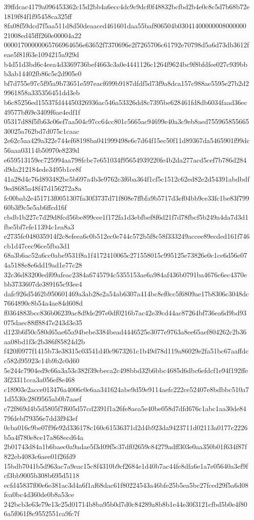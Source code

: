 {39ffdcac4179a096453362c15d2bb4a6ecc4dc9c9dcf0f48832bcfbd2b4e0c8c5d7b68b72e1819f84f1f95458ca325ff
8fa08f59dcd7f5aa511d8d50deaaced461601daa55baf806504b0304140000000800000021008ed45fff260e00004a22
00001700000065766964656e63652f7370696e2f7265706c61792e70798d5a6d73db3612feae5f81f63e1094215a929d
b4d51d3bd6c4eea4d3369736bef4663c3a0e4441126c1264f9624bc9f8bfdfee027c939bbb3ab14402fb86c5e2d905e0
bf7d755e97c5f95a9b73651e597eacf699b9187dfdf5d73f9a8dca157c988ae5595e27b2d29961858a335356451dd3eb
b6c85256ed15537fd44450326936ac546a53326dd8c7395be628461fd8db6034faad36ec49577bf69e3409f6ae4edf1f
05317d88f5fb63c06ef7aa504c97cc64cc801c5665ac94699e40a3c9eb8aed75596585566530025a762bd7d075c1caac
2e62c5aa429a322e744ef68198ba041999498e6c7d64f15ec50f11d89367da5465901f99dc56aaa03114b50970e8239d
e659513159ec725994aa798fcbc7e651034f95654939220fe4b2da277acd5cef7b786d284d9da212184ede3495b1ce8f
41a28d4c76d893482bc5b697a4b3e9762c3f6ba364f1cf5c1512c62ed82e2d54391abdbdf9ed8685a48f47d156272a8a
fc00bab2e451713f0051307fa30f3737d71f808e7ffbfa9b5717d3ef04bb9ce33fc1be83f79960b3f9c5e5ab6ffcd16f
cbdb1b227c7d29d8fcd56be899cee1f172fa1d3ebfbef8f6d21f7d78fbcf5b249a4da7d3d1fbe5bf7efe11394c1ea8a3
e2735fc048035914f2c8efeea6c0b512ec0e744c572b5f8c58f333249accee89ecded161f746cb1d47cec96ce5fba3d1
68a3b6ac52a6cc0abe9531f8a1f4172410065c271558015c995125e73826e0c1ce6d56e074a5188e8e6dd19ad1e77c28
32c36d83200edf09afeac2384a6745794c5355153ae6a984af436b0791ba4676c6ec4370ebb3733607de389165c93ee4
dafc926d5462b950601469a3ab28e2a54ab6307a414bc8ef0cc5f6809ae17b8306c3048dc7664890c8b54a4ae84d608d
f0364883bcc836b06239ac8d9de297e0df0216b7ac42e39cd44ac87264bf736ea6d9bd93075daec88ff8847e243d3e35
d123b6f50c580d65ae65a94bebe3384bead4446525e3077e9763a8ee65aef804262c2b36aa08bd1f3c2b386f85824d2b
f420f0977f1415b73e38315c03541d40c9673261c1b49d78d119a86029e2fa51bc67aaffdcc582d95923c14b9b2c0d60
5e244c7904ed9c66a3a53c382f39ebeca2c498bbd32b6bbc4685d6dbc6efdcf1e94f192ffe3f23311cca3a056ef8e468
c18903e2acce013476a4006c0e6aa341624abe9d59e9114aefc222ce52407e8bdbbc510a71d5530c2809565ab0b7aaef
c72f869d4b5d5805f7f605d57cd2391f1a26fe8aea5e40be058d7dfd676c1abc1aa30de8479fdebf79356e7dd3f943ef
0cba016c9be07f9fe92d336178c160c61536371d2d4b923da9423711d02113a0177c2226b5a4f780e8ce17a868ecd64a
2b01743d84a1b6baec0a9adae5f3d09f5c37df02659c84279adff303e0aa350b01f634f87f822eb4083c6aee01f26fd9
15bdb7041b5d963ac7a9eac15c8f4310b9cf2684e1d40b7ac44fe8dfa6e1a7e05640a3ef9fcf3bb9005b308b695d5118
ecfd45837f00e6e381ac3d4a6f1af68dac61f80224543a46bfe25b5ea5bc27fced29f5a6d08fea0bc4d360de0b8a53ce
242bcb3e63e79e13c25d01714b8ba95b0d7d0c84289a8b8b1e44e30f3121cfbd5b0e4f806a5f061f8c9552551ca9fc7f
}
